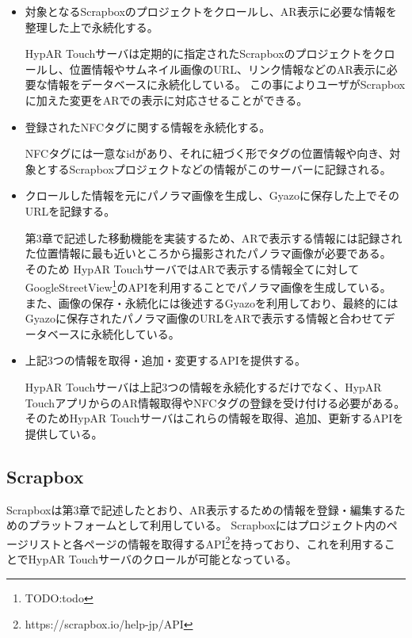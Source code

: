 \begin{itemize}
  \item 対象となるScrapboxのプロジェクトをクロールし、AR表示に必要な情報を整理した上で永続化する。
  
  HypAR Touchサーバは定期的に指定されたScrapboxのプロジェクトをクロールし、位置情報やサムネイル画像のURL、リンク情報などのAR表示に必要な情報をデータベースに永続化している。
  この事によりユーザがScrapboxに加えた変更をARでの表示に対応させることができる。
  \newline

  \item 登録されたNFCタグに関する情報を永続化する。
  
  NFCタグには一意なidがあり、それに紐づく形でタグの位置情報や向き、対象とするScrapboxプロジェクトなどの情報がこのサーバーに記録される。
  \newline

  \item クロールした情報を元にパノラマ画像を生成し、Gyazoに保存した上でそのURLを記録する。
  
  第3章で記述した移動機能を実装するため、ARで表示する情報には記録された位置情報に最も近いところから撮影されたパノラマ画像が必要である。
  そのため HypAR TouchサーバではARで表示する情報全てに対してGoogleStreetView\footnote{\textsf{TODO:todo}}のAPIを利用することでパノラマ画像を生成している。
  また、画像の保存・永続化には後述するGyazoを利用しており、最終的にはGyazoに保存されたパノラマ画像のURLをARで表示する情報と合わせてデータベースに永続化している。
  \newline

  \item 上記3つの情報を取得・追加・変更するAPIを提供する。
  
  HypAR Touchサーバは上記3つの情報を永続化するだけでなく、HypAR TouchアプリからのAR情報取得やNFCタグの登録を受け付ける必要がある。
  そのためHypAR Touchサーバはこれらの情報を取得、追加、更新するAPIを提供している。
  \newline

\end{itemize}

\subsection{Scrapbox}
Scrapboxは第3章で記述したとおり、AR表示するための情報を登録・編集するためのプラットフォームとして利用している。
Scrapboxにはプロジェクト内のページリストと各ページの情報を取得するAPI\footnote{\textsf{https://scrapbox.io/help-jp/API}}を持っており、これを利用することでHypAR Touchサーバのクロールが可能となっている。

